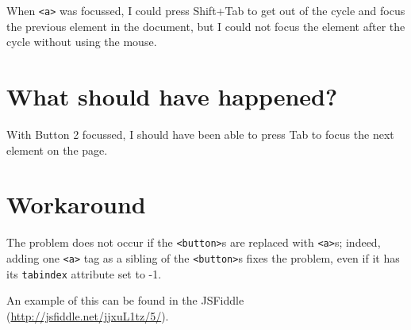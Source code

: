 When \texttt{\textless{}a\textgreater{}} was focussed, I could press
Shift+Tab to get out of the cycle and focus the previous element in the
document, but I could not focus the element after the cycle without
using the mouse.

\section{What should have happened?}\label{what-should-have-happened}

With Button 2 focussed, I should have been able to press Tab to focus
the next element on the page.

\section{Workaround}\label{workaround}

The problem does not occur if the
\texttt{\textless{}button\textgreater{}}s are replaced with
\texttt{\textless{}a\textgreater{}}s; indeed, adding one
\texttt{\textless{}a\textgreater{}} tag as a sibling of the
\texttt{\textless{}button\textgreater{}}s fixes the problem, even if it
has its \texttt{tabindex} attribute set to -1.

An example of this can be found in the JSFiddle
(\url{http://jsfiddle.net/jjxuL1tz/5/}).
